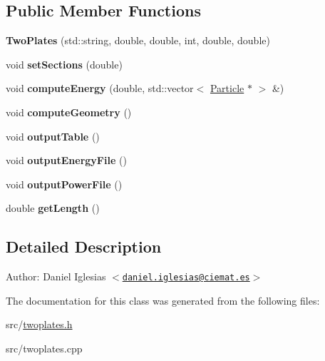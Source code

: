 \subsection*{Public Member Functions}
\begin{CompactItemize}
\item 
\hypertarget{classTwoPlates_c1dfa39d5a74aad3e53b12c4bbdcff4e}{
\textbf{TwoPlates} (std::string, double, double, int, double, double)}
\label{classTwoPlates_c1dfa39d5a74aad3e53b12c4bbdcff4e}

\item 
\hypertarget{classTwoPlates_23168c87f9097b2c1a4fa8cac4b61049}{
void \textbf{setSections} (double)}
\label{classTwoPlates_23168c87f9097b2c1a4fa8cac4b61049}

\item 
\hypertarget{classTwoPlates_68c5911a0b3c24f59c3df0335f1e6c94}{
void \textbf{computeEnergy} (double, std::vector$<$ \hyperlink{classParticle}{Particle} $\ast$ $>$ \&)}
\label{classTwoPlates_68c5911a0b3c24f59c3df0335f1e6c94}

\item 
\hypertarget{classTwoPlates_890d6b6ec49ff021d5d34bf1c2a83099}{
void \textbf{computeGeometry} ()}
\label{classTwoPlates_890d6b6ec49ff021d5d34bf1c2a83099}

\item 
\hypertarget{classTwoPlates_8688d978fd1845b370d3fc14d8737e9e}{
void \textbf{outputTable} ()}
\label{classTwoPlates_8688d978fd1845b370d3fc14d8737e9e}

\item 
\hypertarget{classTwoPlates_33685a28d22c33fc1ea5df7ce33bbd66}{
void \textbf{outputEnergyFile} ()}
\label{classTwoPlates_33685a28d22c33fc1ea5df7ce33bbd66}

\item 
\hypertarget{classTwoPlates_e8a0aeb3b391f9663f0359ef82b01d60}{
void \textbf{outputPowerFile} ()}
\label{classTwoPlates_e8a0aeb3b391f9663f0359ef82b01d60}

\item 
\hypertarget{classTwoPlates_6bff308b65ed2bfe33098ae210626b30}{
double \textbf{getLength} ()}
\label{classTwoPlates_6bff308b65ed2bfe33098ae210626b30}

\end{CompactItemize}


\subsection{Detailed Description}
\begin{Desc}
\item[Author:]Daniel Iglesias $<$\href{mailto:daniel.iglesias@ciemat.es}{\tt daniel.iglesias@ciemat.es}$>$ \end{Desc}


The documentation for this class was generated from the following files:\begin{CompactItemize}
\item 
src/\hyperlink{twoplates_8h}{twoplates.h}\item 
src/twoplates.cpp\end{CompactItemize}
